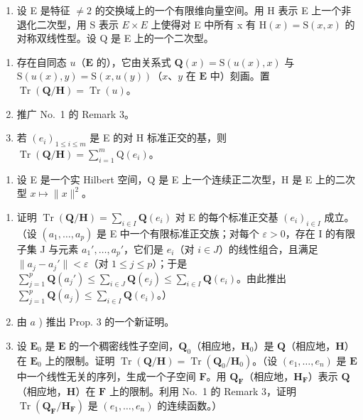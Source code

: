 
\begin{enumerate}
\def\labelenumi{\arabic{enumi})}
\tightlist
\item
  设 E 是特征 \(\neq 2\) 的交换域上的一个有限维向量空间。用 H 表示 E 上一个非退化二次型，用 S 表示 \(E \times E\) 上使得对 E 中所有 x 有 \(\mathrm{H}(x) = \mathrm{S}(x, x)\) 的对称双线性型。设 Q 是 E 上的一个二次型。
\end{enumerate}

\begin{enumerate}
\def\labelenumi{\alph{enumi})}
\item
  存在自同态 \(u\)（\(\mathbf{E}\) 的），它由关系式 \(\mathbf{Q}(x) = \mathrm{S}(u(x), x)\) 与 \(\mathrm{S}(u(x), y) = \mathrm{S}(x, u(y))\)（\(x\)、\(y\) 在 \(\mathbf{E}\) 中）刻画。置 \(\operatorname{Tr}(\mathbf{Q}/\mathbf{H}) = \operatorname{Tr}(u)\)。
\item
  推广 No.~1 的 Remark 3。
\item
  若 \((e_i)_{1\leqslant i\leqslant m}\) 是 E 的对 H 标准正交的基，则 \(\operatorname{Tr}(\mathbf{Q}/\mathbf{H}) = \sum_{i=1}^{m}\mathrm{Q}(e_i)\)。
\end{enumerate}

\begin{enumerate}
\def\labelenumi{\arabic{enumi})}
\setcounter{enumi}{1}
\tightlist
\item
  设 E 是一个实 Hilbert 空间，Q 是 E 上一个连续正二次型，H 是 E 上的二次型 \(x \mapsto \|x\|^2\)。
\end{enumerate}

\begin{enumerate}
\def\labelenumi{\alph{enumi})}
\item
  证明 \(\operatorname{Tr}(\mathbf{Q}/\mathbf{H}) = \sum_{i \in I} \mathbf{Q}(e_i)\) 对 E 的每个标准正交基 \((e_i)_{i \in I}\) 成立。（设 \((a_1, \ldots, a_p)\) 是 E 中一个有限标准正交族；对每个 \(\varepsilon > 0\)，存在 I 的有限子集 J 与元素 \(a_1', \ldots, a_p'\)，它们是 \(e_i\)（对 \(i \in J\)）的线性组合，且满足 \(\|a_j - a_j' \| < \varepsilon\)（对 \(1 \leqslant j \leqslant p\)）；于是 \(\sum_{j=1}^{p} \mathbf{Q}(a_j') \leqslant \sum_{i \in J} \mathbf{Q}(e_j) \leqslant \sum_{i \in I} \mathbf{Q}(e_i)\)。由此推出 \(\sum_{j=1}^{p} \mathbf{Q}(a_j) \leqslant \sum_{i \in I} \mathbf{Q}(e_i)\)。）
\item
  由 \(a\) ) 推出 Prop. 3 的一个新证明。
\item
  设 \(\mathbf{E}_0\) 是 \(\mathbf{E}\) 的一个稠密线性子空间，\(\mathbf{Q}_0\)（相应地，\(\mathbf{H}_0\)）是 \(\mathbf{Q}\)（相应地，\(\mathbf{H}\)）在 \(\mathbf{E}_0\) 上的限制。证明 \(\operatorname{Tr}(\mathbf{Q}/\mathbf{H}) = \operatorname{Tr}(\mathbf{Q}_0/\mathbf{H}_0)\)。（设 \((e_1, \ldots, e_n)\) 是 \(\mathbf{E}\) 中一个线性无关的序列，生成一个子空间 \(\mathbf{F}\)。用 \(\mathbf{Q}_{\mathbf{F}}\)（相应地，\(\mathbf{H}_{\mathbf{F}}\)）表示 \(\mathbf{Q}\)（相应地，\(\mathbf{H}\)）在 \(\mathbf{F}\) 上的限制。利用 No.~1 的 Remark 3，证明 \(\operatorname{Tr}(\mathbf{Q}_{\mathbf{F}}/\mathbf{H}_{\mathbf{F}})\) 是 \((e_1, \ldots, e_n)\) 的连续函数。）
\end{enumerate}

